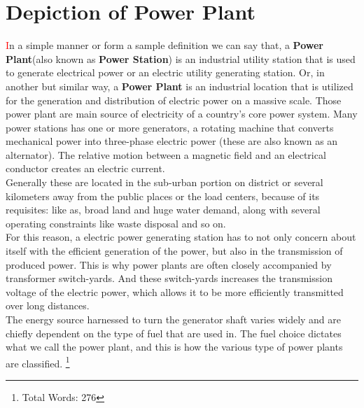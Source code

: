 \documentclass[11 pt]{article}
\begin{document}
\section{Depiction of Power Plant}
{\huge\textcolor{red}{\hspace{5 mm}I}}n a simple manner or form a sample definition we can say that, a \textbf{Power Plant}(also known as \textbf{Power Station}) is an industrial utility station that is used to generate electrical power or an electric utility generating station. Or, in another but similar way, a \textbf{Power Plant} is an industrial location that is utilized for the generation and distribution of electric power on a massive scale. Those power plant are main source of electricity of a country's core power system. Many power stations has one or more generators, a rotating machine that converts mechanical power into three-phase electric power (these are also known as an alternator). The relative motion between a magnetic field and an electrical conductor creates an electric current.\vspace{2 mm}\\
Generally these are located in the sub-urban portion on district or several kilometers away from the public places or the load centers, because of its requisites: like as, broad land and huge water demand, along with several operating constraints like waste disposal and so on.\vspace{2 mm}\\
For this reason, a electric power generating station has to not only concern about itself with the efficient generation of the power, but also in the transmission of produced power. This is why power plants are often closely accompanied by transformer switch-yards. And these switch-yards increases the transmission voltage of the electric power, which allows it to be more efficiently transmitted over long distances.\vspace{2 mm}\\
The energy source harnessed to turn the generator shaft varies widely and are chiefly dependent on the type of fuel that are used in. The fuel choice dictates what we call the power plant, and this is how the various type of power plants are classified.
\footnote{Total Words: 276}

\pagebreak
\end{document}
